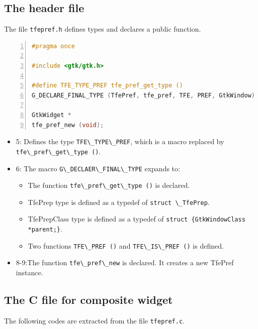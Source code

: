 \subsection{The header file}\label{the-header-file}

The file \passthrough{\lstinline!tfepref.h!} defines types and declares
a public function.

\begin{lstlisting}[language=C, numbers=left]
#pragma once

#include <gtk/gtk.h>

#define TFE_TYPE_PREF tfe_pref_get_type ()
G_DECLARE_FINAL_TYPE (TfePref, tfe_pref, TFE, PREF, GtkWindow)

GtkWidget *
tfe_pref_new (void);
\end{lstlisting}

\begin{itemize}
\tightlist
\item
  5: Defines the type \passthrough{\lstinline!TFE\_TYPE\_PREF!}, which
  is a macro replaced by
  \passthrough{\lstinline!tfe\_pref\_get\_type ()!}.
\item
  6: The macro \passthrough{\lstinline!G\_DECLAER\_FINAL\_TYPE!} expands
  to:

  \begin{itemize}
  \tightlist
  \item
    The function \passthrough{\lstinline!tfe\_pref\_get\_type ()!} is
    declared.
  \item
    TfePrep type is defined as a typedef of
    \passthrough{\lstinline!struct \_TfePrep!}.
  \item
    TfePrepClass type is defined as a typedef of
    \passthrough{\lstinline!struct \{GtkWindowClass *parent;\}!}.
  \item
    Two functions \passthrough{\lstinline!TFE\_PREF ()!} and
    \passthrough{\lstinline!TFE\_IS\_PREF ()!} is defined.
  \end{itemize}
\item
  8-9:The function \passthrough{\lstinline!tfe\_pref\_new!} is declared.
  It creates a new TfePref instance.
\end{itemize}

\subsection{The C file for composite
widget}\label{the-c-file-for-composite-widget}

The following codes are extracted from the file
\passthrough{\lstinline!tfepref.c!}.


